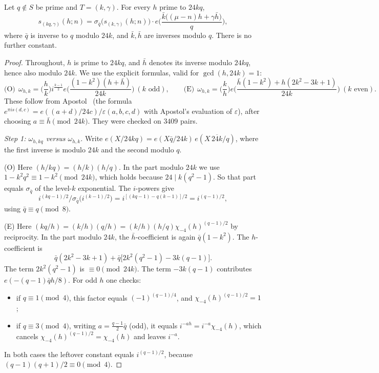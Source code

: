 \documentclass[11pt]{amsart}
\theoremstyle{definition}\newtheorem{definition}[theorem]{Definition}
\theoremstyle{remark}\newtheorem{remark}[theorem]{Remark}
\begin{document}
\begin{lemma}\label{lem:summand}
Let $q\notin S$ be prime and $T=(k,\gamma)$. For every $h$ prime to $24kq$,
\[
s_{(kq,\gamma)}(h;n)=\sigma_{\bar q}\big(s_{(k,\gamma)}(h;n)\big)\cdot e\Big(\frac{\bar k\big((\mu-n)h+\gamma\bar h\big)}{q}\Big),
\]
where $\bar q$ is inverse to $q$ modulo $24k$, and $\bar k,\bar h$ are inverses modulo $q$. There is no further constant.
\end{lemma}
\begin{proof}
Throughout, $h$ is prime to $24kq$, and $\bar h$ denotes its inverse modulo $24kq$, hence also modulo $24k$. We use the explicit formulas, valid for $\gcd(h,24k)=1$:
\[
\text{(O)}\ \ \omega_{h,k}=\Big(\frac hk\Big)i^{\frac{k-1}2}e\Big(\frac{(1-k^2)(h+\bar h)}{24k}\Big)\ (k\text{ odd}),\qquad
\text{(E)}\ \ \omega_{h,k}=\Big(\frac kh\Big)e\Big(\frac{\bar h(1-k^2)+h(2k^2-3k+1)}{24k}\Big)\ (k\text{ even}).
\]
These follow from Apostol~\cite[Thm.~3.4]{Ap} (the formula $e^{\pi is(d,c)}=e((a+d)/24c)/\varepsilon(a,b,c,d)$ with Apostol's evaluation of $\varepsilon$), after choosing $a\equiv\bar h\pmod{24k}$. They were checked on $3409$ pairs.

\emph{Step 1: $\omega_{h,kq}$ versus $\omega_{h,k}$.} Write $e(X/24kq)=e(X\bar q/24k)\,e(X\,\overline{24k}/q)$, where the first inverse is modulo $24k$ and the second modulo $q$.

(O) Here $(h/kq)=(h/k)(h/q)$. In the part modulo $24k$ we use $1-k^2q^2\equiv1-k^2\pmod{24k}$, which holds because $24\mid k(q^2-1)$. So that part equals $\sigma_{\bar q}$ of the level-$k$ exponential. The $i$-powers give
\[
i^{(kq-1)/2}\big/\sigma_{\bar q}\big(i^{(k-1)/2}\big)=i^{[(kq-1)-q(k-1)]/2}=i^{(q-1)/2},
\]
using $\bar q\equiv q\pmod 8$.

(E) Here $(kq/h)=(k/h)(q/h)=(k/h)(h/q)\chi_{-4}(h)^{(q-1)/2}$ by reciprocity. In the part modulo $24k$, the $\bar h$-coefficient is again $\bar q(1-k^2)$. The $h$-coefficient is
\[
\bar q(2k^2-3k+1)+\bar q\big[2k^2(q^2-1)-3k(q-1)\big].
\]
The term $2k^2(q^2-1)$ is $\equiv0\pmod{24k}$. The term $-3k(q-1)$ contributes $e(-(q-1)\bar qh/8)$. For odd $h$ one checks:
\begin{itemize}[leftmargin=1.5em]
\item if $q\equiv1\pmod4$, this factor equals $(-1)^{(q-1)/4}$, and $\chi_{-4}(h)^{(q-1)/2}=1$;
\item if $q\equiv3\pmod4$, writing $a=\tfrac{q-1}2\bar q$ (odd), it equals $i^{-ah}=i^{-a}\chi_{-4}(h)$, which cancels $\chi_{-4}(h)^{(q-1)/2}=\chi_{-4}(h)$ and leaves $i^{-a}$.
\end{itemize}
In both cases the leftover constant equals $i^{(q-1)/2}$, because $(q-1)(q+1)/2\equiv0\pmod4$.


\end{proof}
\end{document}
